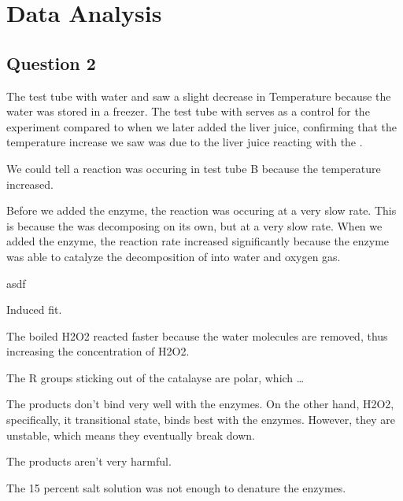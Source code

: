 \documentclass[12pt]{article}
\begin{document}
\section*{Data Analysis}

\subsection*{Question 2}
\begin{enumAlph}
    \item The test tube with water and  saw a slight decrease in Temperature
    because the water was stored in a freezer. The test tube with
    serves as a control for the experiment compared to when we later 
    added the liver juice, confirming that the temperature increase we saw
    was due to the liver juice reacting with the . 
    \item We could tell a reaction was occuring in test tube B 
    because the temperature increased. 
    \item Before we added the enzyme, the reaction was occuring at 
    a very slow rate. This is because the  was decomposing
    on its own, but at a very slow rate. When we added the enzyme, the
    reaction rate increased significantly because the enzyme was able to
    catalyze the decomposition of  into water and oxygen gas.
    \item asdf
    \item Induced fit. 
\end{enumAlph}

The boiled H2O2 reacted faster because the water molecules
are removed, thus increasing the concentration of H2O2. 

The R groups sticking out of the catalayse 
are polar, which \dots 

The products don't bind very well with the enzymes. On 
the other hand, H2O2, specifically, it transitional
state, binds best with the enzymes. However, they are 
unstable, which means they eventually break down.

The products aren't very harmful. 

The 15 percent salt solution was not enough to denature the 
enzymes. 
\end{document}
